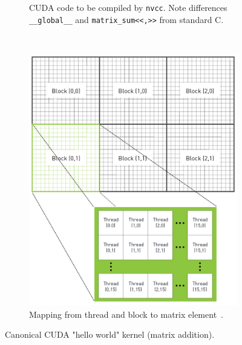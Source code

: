 \begin{figure}
    \centering
    \begin{subfigure}{\linewidth}
        \centering
        \caption{CUDA code to be compiled by \texttt{nvcc}.
        Note differences \texttt{__global__} and \texttt{matrix_sum<<,>>} from standard C.
        }
        \label{lst:cuda_hello_world}
    \end{subfigure}
    \\[3ex]
    \begin{subfigure}{\linewidth}
        \centering
        \includegraphics[width=\linewidth]{figures/matrix_thread.png}
        \caption{Mapping from thread and block to matrix element~\cite{10.5555/1891996}.}
        \label{fig:matrix_thread}
    \end{subfigure}
    \caption{Canonical CUDA "hello world" kernel (matrix addition).}
    \label{fig:cuda_hello_world}
\end{figure}
